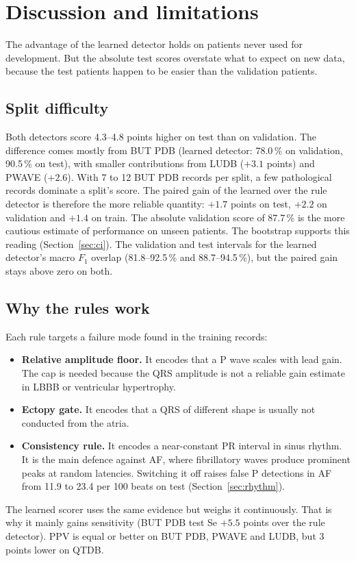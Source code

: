 \documentclass[11pt,a4paper]{article}
\begin{document}
\section{Discussion and limitations}
\label{sec:discussion}

The advantage of the learned detector holds on patients never used for development. But the absolute test scores overstate what to expect on new data, because the test patients happen to be easier than the validation patients.

\subsection{Split difficulty}
\label{sec:splitdiff}

Both detectors score 4.3--4.8 points higher on test than on validation. The difference comes mostly from BUT PDB (learned detector: 78.0\,\% on validation, 90.5\,\% on test), with smaller contributions from LUDB ($+3.1$ points) and PWAVE ($+2.6$). With 7 to 12 BUT PDB records per split, a few pathological records dominate a split's score. The paired gain of the learned over the rule detector is therefore the more reliable quantity: $+1.7$ points on test, $+2.2$ on validation and $+1.4$ on train. The absolute validation score of 87.7\,\% is the more cautious estimate of performance on unseen patients. The bootstrap supports this reading (Section~\ref{sec:ci}). The validation and test intervals for the learned detector's macro $F_1$ overlap (81.8--92.5\,\% and 88.7--94.5\,\%), but the paired gain stays above zero on both.

\subsection{Why the rules work}

Each rule targets a failure mode found in the training records:
\begin{itemize}
\item \textbf{Relative amplitude floor.} It encodes that a P wave scales with lead gain. The cap is needed because the QRS amplitude is not a reliable gain estimate in LBBB or ventricular hypertrophy.
\item \textbf{Ectopy gate.} It encodes that a QRS of different shape is usually not conducted from the atria.
\item \textbf{Consistency rule.} It encodes a near-constant PR interval in sinus rhythm. It is the main defence against AF, where fibrillatory waves produce prominent peaks at random latencies. Switching it off raises false P detections in AF from 11.9 to 23.4 per 100 beats on test (Section~\ref{sec:rhythm}).
\end{itemize}
The learned scorer uses the same evidence but weighs it continuously. That is why it mainly gains sensitivity (BUT PDB test Se $+5.5$ points over the rule detector). PPV is equal or better on BUT PDB, PWAVE and LUDB, but 3 points lower on QTDB.
\end{document}
